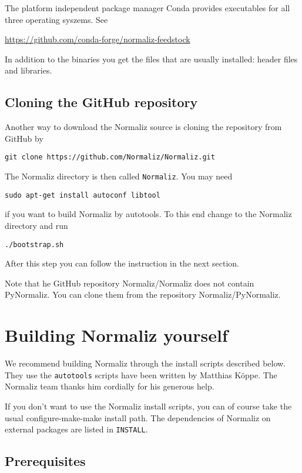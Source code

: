 \documentclass[12pt,a4paper]{scrartcl}
\theoremstyle{definition}
\begin{document}
The platform independent package manager Conda provides executables for all three operating syszems. See
\begin{center}
	\url{https://github.com/conda-forge/normaliz-feedstock}
\end{center}
In addition to the binaries you get the files that are usually installed: header files and libraries.

\subsection{Cloning the GitHub repository}

Another way to download the Normaliz source is cloning the repository from GitHub by
\begin{Verbatim}
git clone https://github.com/Normaliz/Normaliz.git
\end{Verbatim}
The Normaliz directory is then called \verb|Normaliz|. You may need
\begin{Verbatim}
sudo apt-get install autoconf libtool
\end{Verbatim}
if you want to build Normaliz by autotools. To this end change to the Normaliz directory and run
\begin{Verbatim}
./bootstrap.sh
\end{Verbatim}
After this step you can follow the instruction in the next section.

Note that he GitHub repository Normaliz/Normaliz does not contain PyNormaliz. You can clone them from the repository Normaliz/PyNormaliz.

\section{Building Normaliz yourself}\label{Compile}

We recommend building Normaliz through the install scripts described below. They use the \verb|autotools| scripts have been written by Matthias K\"oppe. The Normaliz team thanks him cordially for his generous help.

If you don't want to use the Normaliz install scripts, you can of course take the usual configure-make-make install path. The dependencies of Normaliz on external packages are listed in \verb|INSTALL|.

\subsection{Prerequisites}
\end{document}
